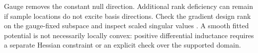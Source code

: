 Gauge removes the constant null direction. Additional rank deficiency can
remain if sample locations do not excite basis directions. Check the gradient
design rank on the gauge-fixed subspace and inspect scaled singular values
\cite{horn2013}. A smooth fitted potential is not necessarily locally convex:
positive differential inductance requires a separate Hessian constraint or
an explicit check over the supported domain.
